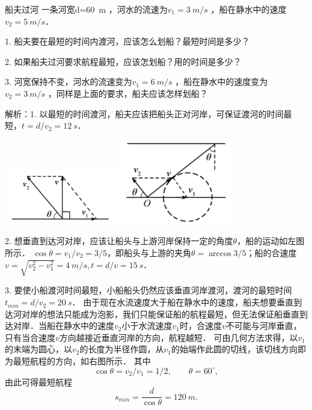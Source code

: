 \begin{app}{船夫过河}{}
一条河宽d=\SI{60}{m} ，河水的流速为$ v_1 = \SI{3}{m/s} $ ，船在静水中的速度$ v_2 = \SI{5}{m/s} $．

1. 船夫要在最短的时间内渡河，应该怎么划船？最短时间是多少？

2. 如果船夫过河要求航程最短，应该怎划船？用的时间是多少？

3. 河宽保持不变，河水的流速变为$ v_1 = \SI{6}{m/s} $ ，船在静水中的速度变为$ v_2 = \SI{3}{m/s} $  ，同样是上面的要求，船夫应该怎样划船？


\tcblower

解析：1. 以最短的时间渡河，船夫应该把船头正对河岸，可保证渡河的时间最短，$ t=d/v_2 =\SI{12}{s} $．


\begin{center}
	\includegraphics[width=0.3\linewidth]{image/kinamatics-1}\qquad\qquad 	\includegraphics[width=0.2\linewidth]{image/kinamatics-2}
\end{center}

2. 想垂直到达河对岸，应该让船头与上游河岸保持一定的角度$ \theta $，船的运动如左图所示．
$ \cos\theta =v_1/v_2 =3/5 $，即船头与上游的夹角$\theta=\arccos⁡3/5$；船的合速度$ v=\sqrt{v_2^2-v_1^2}=4~\si{m/s} ,t=d/v=15~\si{s}  $．

3. 要使小船渡河时间最短，小船船头仍然应该垂直河岸渡河，渡河的最短时间$ t_{min} = d/v_2 = \SI{20}{s} $．
由于现在水流速度大于船在静水中的速度，船夫想要垂直到达河对岸的想法只能成为泡影，我们只能保证船的航程最短，但无法保证船垂直到达对岸．当船在静水中的速度$ v_2 $小于水流速度$ v_1 $时，合速度$ v $不可能与河岸垂直，只有当合速度$ v $方向越接近垂直河岸的方向，航程越短．
可由几何方法求得，以$ v_1 $的末端为圆心，以$ v_2 $的长度为半径作圆，从$ v_1 $的始端作此圆的切线，该切线方向即为最短航程的方向，如右图所示．
其中
\[
\cos\theta = v_2/v_1
 = 1/2,\qquad \theta =  60^\circ,\]
 由此可得最短航程
 \[
 s_{min} = \frac{d}{\cos\theta} = 120~\si{m}.
 \]


\end{app}



